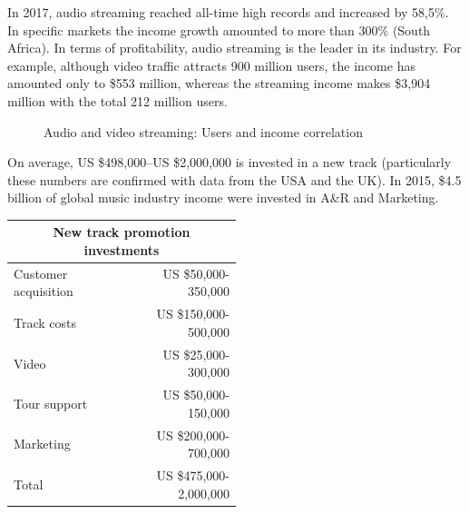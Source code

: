 \documentclass[12pt]{report}
\begin{document}
In 2017, audio streaming reached all-time high records and increased by 58,5\%. In specific markets the income growth amounted to more than 300\% (South Africa). In terms of profitability, audio streaming is the leader in its industry. For example, although video traffic attracts 900 million users, the income has amounted only to \$553 million, whereas the streaming income makes \$3,904 million with the total 212 million users.

\begin{figure}[H]
\centering
\caption{Audio and video streaming: Users and income correlation}
\vspace{20pt}
\userRevenue
{}
\end{figure}	

On average, US \$498,000–US \$2,000,000 is invested in a new track (particularly these numbers are confirmed with data from the USA and the UK). In 2015, \$4.5 billion of global music industry income were invested in A\&R and Marketing.

\def\InvestToRecord{New track promotion investments}
\def\Clients{Customer acquisition}
\def\Record{Track costs}
\def\Video{Video}
\def\Tour{Tour support}
\def\Marketing{Marketing}
\def\Sum{Total}

\begin{table}[H]
\centering
\begin{tabular}{p{0.5\linewidth}r}
\toprule
\multicolumn{2}{c}{\InvestToRecord} \\
\bottomrule
\midrule
\Clients					& US \$50,000-350,000 \\
\Record					& US \$150,000-500,000 \\
\Video					& US \$25,000-300,000 \\
\Tour					& US \$50,000-150,000 \\
\Marketing			& US \$200,000-700,000 \\
\Sum 					& US \$475,000-2,000,000 \\
\bottomrule
\end{tabular}
\end{table}
\end{document}
